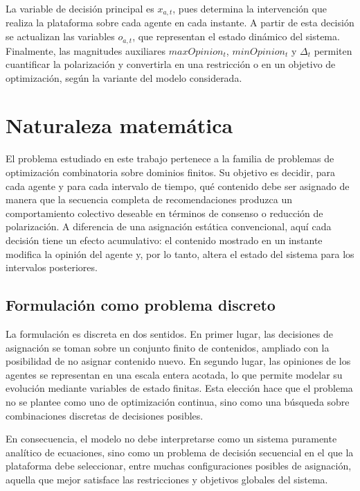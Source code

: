 \documentclass[10pt,letterpaper]{article}
\begin{document}
La variable de decisi\'on principal es \(x_{a,t}\), pues determina la intervenci\'on que realiza la plataforma sobre cada agente en cada instante. A partir de esta decisi\'on se actualizan las variables \(o_{a,t}\), que representan el estado din\'amico del sistema. Finalmente, las magnitudes auxiliares \(maxOpinion_t\), \(minOpinion_t\) y \(\Delta_t\) permiten cuantificar la polarizaci\'on y convertirla en una restricci\'on o en un objetivo de optimizaci\'on, seg\'un la variante del modelo considerada.

\section{Naturaleza matem\'atica}

El problema estudiado en este trabajo pertenece a la familia de problemas de optimizaci\'on combinatoria sobre dominios finitos. Su objetivo es decidir, para cada agente y para cada intervalo de tiempo, qu\'e contenido debe ser asignado de manera que la secuencia completa de recomendaciones produzca un comportamiento colectivo deseable en t\'erminos de consenso o reducci\'on de polarizaci\'on. A diferencia de una asignaci\'on est\'atica convencional, aqu\'i cada decisi\'on tiene un efecto acumulativo: el contenido mostrado en un instante modifica la opini\'on del agente y, por lo tanto, altera el estado del sistema para los intervalos posteriores.

\subsection{Formulaci\'on como problema discreto}

La formulaci\'on es discreta en dos sentidos. En primer lugar, las decisiones de asignaci\'on se toman sobre un conjunto finito de contenidos, ampliado con la posibilidad de no asignar contenido nuevo. En segundo lugar, las opiniones de los agentes se representan en una escala entera acotada, lo que permite modelar su evoluci\'on mediante variables de estado finitas. Esta elecci\'on hace que el problema no se plantee como uno de optimizaci\'on continua, sino como una b\'usqueda sobre combinaciones discretas de decisiones posibles.

En consecuencia, el modelo no debe interpretarse como un sistema puramente anal\'itico de ecuaciones, sino como un problema de decisi\'on secuencial en el que la plataforma debe seleccionar, entre muchas configuraciones posibles de asignaci\'on, aquella que mejor satisface las restricciones y objetivos globales del sistema.
\end{document}
